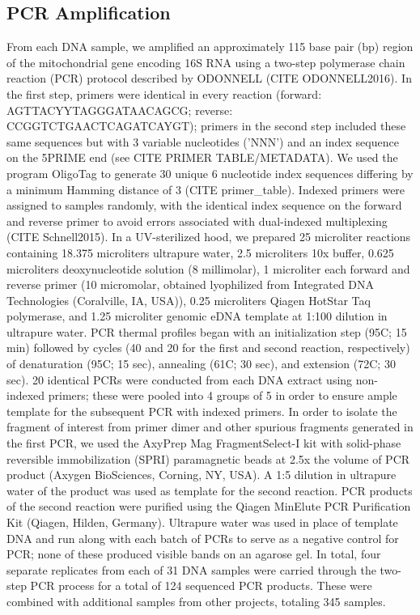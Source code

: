 \documentclass[11pt,letterpaper]{article} %
\begin{document}
\subsection*{PCR Amplification}

From each DNA sample, we amplified an approximately 115 base pair (bp) region of the mitochondrial gene encoding 16S RNA using a two-step polymerase chain reaction (PCR) protocol described by ODONNELL (CITE ODONNELL2016).
In the first step, primers were identical in every reaction (forward: AGTTACYYTAGGGATAACAGCG; reverse: CCGGTCTGAACTCAGATCAYGT); primers in the second step included these same sequences but with 3 variable nucleotides ('NNN') and an index sequence on the 5PRIME end (see CITE PRIMER TABLE/METADATA).
We used the program OligoTag \cite{Coissac2012} to generate 30 unique 6 nucleotide index sequences differing by a minimum Hamming distance of 3 (CITE primer\_table). %
Indexed primers were assigned to samples randomly, with the identical index sequence on the forward and reverse primer to avoid errors associated with dual-indexed multiplexing (CITE Schnell2015).
In a UV-sterilized hood, we prepared 25 microliter reactions containing 18.375 microliters ultrapure water, 2.5 microliters 10x buffer, 0.625 microliters deoxynucleotide solution (8 millimolar), 1 microliter each forward and reverse primer (10 micromolar, obtained lyophilized from Integrated DNA Technologies (Coralville, IA, USA)), 0.25 microliters Qiagen HotStar Taq polymerase, and 1.25 microliter genomic eDNA template at 1:100 dilution in ultrapure water.
PCR thermal profiles began with an initialization step (95C; 15 min) followed by cycles (40 and 20 for the first and second reaction, respectively) of denaturation (95C; 15 sec), annealing (61C; 30 sec), and extension (72C; 30 sec).
20 identical PCRs were conducted from each DNA extract using non-indexed primers; these were pooled into 4 groups of 5 in order to ensure ample template for the subsequent PCR with indexed primers. %
In order to isolate the fragment of interest from primer dimer and other spurious fragments generated in the first PCR, we used the AxyPrep Mag FragmentSelect-I kit with solid-phase reversible immobilization (SPRI) paramagnetic beads at 2.5x the volume of PCR product (Axygen BioSciences, Corning, NY, USA).
A 1:5 dilution in ultrapure water of the product was used as template for the second reaction.
PCR products of the second reaction were purified using the Qiagen MinElute PCR Purification Kit (Qiagen, Hilden, Germany).
Ultrapure water was used in place of template DNA and run along with each batch of PCRs to serve as a negative control for PCR; none of these produced visible bands on an agarose gel.
In total, four separate replicates from each of 31 DNA samples were carried through the two-step PCR process for a total of 124 sequenced PCR products.
These were combined with additional samples from other projects, totaling 345 samples.
\end{document}
